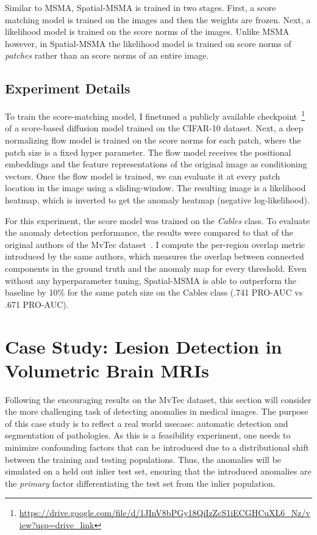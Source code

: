 Similar to MSMA, Spatial-MSMA is trained in two stages. First, a score matching model is trained on the images and then the weights are frozen. Next, a likelihood model is trained on the score norms of the images. Unlike MSMA however, in Spatial-MSMA the likelihood model is trained on score norms of \textit{patches} rather than an score norms of an entire image.

\subsection*{Experiment Details}
To train the score-matching model, I finetuned a publicly available checkpoint~\footnote{\url{https://drive.google.com/file/d/1JInV8bPGy18QiIzZcS1iECGHCuXL6_Nz/view?usp=drive_link}} of a score-based diffusion model trained on the CIFAR-10 dataset. Next, a deep normalizing flow model is trained on the score norms for each patch, where the patch size is a fixed hyper parameter. The flow model receives the positional embeddings and the feature representations of the original image as conditioning vectors. Once the flow model is trained, we can evaluate it at every patch location in the image using a sliding-window. The resulting image is a likelihood heatmap, which is inverted to get the anomaly heatmap (negative log-likelihood).

For this experiment, the score model was trained on the \textit{Cables} class. To evaluate the anomaly detection performance, the results were compared to that of the original authors of the MvTec dataset~\cite{bergmann2020uninformed}. I compute the per-region overlap metric introduced by the same authors, which measures the overlap between connected components in the ground truth and the anomaly map for every threshold. Even without any hyperparameter tuning, Spatial-MSMA is able to outperform the baseline by 10\% for the same patch size on the Cables class (.741 PRO-AUC vs .671 PRO-AUC).


\section{Case Study: Lesion Detection in Volumetric Brain MRIs}
Following the encouraging results on the MvTec dataset, this section will consider the more challenging task of detecting anomalies in medical images. The purpose of this case study is to reflect a real world usecase: automatic detection and segmentation of pathologies. As this is a feasibility experiment, one needs to minimize confounding factors that can be introduced due to a distributional shift between the training and testing populations. Thus, the anomalies will be simulated on a held out inlier test set, ensuring that the introduced anomalies are the \textit{primary} factor differentiating the test set from the inlier population.

